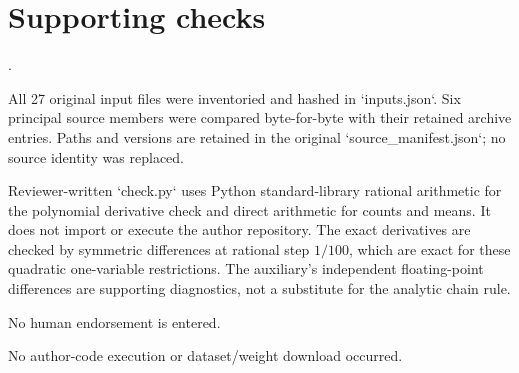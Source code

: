 \documentclass[10pt]{article}
\begin{document}
\section*{Supporting checks}
.\par
All 27 original input files were inventoried and hashed in `inputs.json`. Six principal source members were compared byte-for-byte with their retained archive entries. Paths and versions are retained in the original `source\_manifest.json`; no source identity was replaced.\par
Reviewer-written `check.py` uses Python standard-library rational arithmetic for the polynomial derivative check and direct arithmetic for counts and means. It does not import or execute the author repository. The exact derivatives are checked by symmetric differences at rational step \(1/100\), which are exact for these quadratic one-variable restrictions. The auxiliary’s independent floating-point differences are supporting diagnostics, not a substitute for the analytic chain rule.\par
No human endorsement is entered.\par
No author-code execution or dataset/weight download occurred.\par
\end{document}
